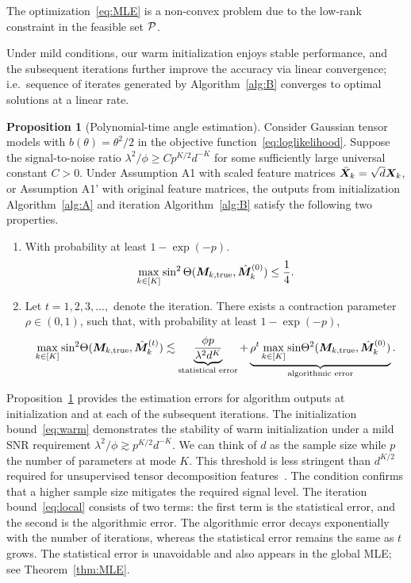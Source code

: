 \documentclass[12pt]{article}
\theoremstyle{definition}
\newtheorem{prop}{Proposition}[section]
\theoremstyle{definition}
\newcommand*{\KeepStyleUnderBrace}[1]{%
  \mathop{%
    \mathchoice
    {\underbrace{\displaystyle#1}}%
    {\underbrace{\textstyle#1}}%
    {\underbrace{\scriptstyle#1}}%
    {\underbrace{\scriptscriptstyle#1}}%
  }\limits
}
\begin{document}
The optimization~\eqref{eq:MLE} is a non-convex problem due to the low-rank constraint in the feasible set $\mathcal{P}$. {  Under mild conditions, our warm initialization enjoys stable performance, and the subsequent iterations further improve the accuracy via linear convergence; i.e.\ sequence of iterates generated by Algorithm~\ref{alg:B} converges to optimal solutions at a linear rate. 

\begin{prop}[Polynomial-time angle estimation]\label{lem:ini} Consider Gaussian tensor models with $b(\theta)=\theta^2/2$ in the objective function~\eqref{eq:loglikelihood}. Suppose the signal-to-noise ratio $\lambda^2/\phi \geq C p^{K/2}d^{-K}$ for some sufficiently large universal constant $C>0$. 
Under Assumption A1 with scaled feature matrices $\bar {\bm X}_k=\sqrt{d}\bm X_k$, or Assumption A1' with original feature matrices, the outputs from initialization Algorithm~\ref{alg:A} and iteration Algorithm~\ref{alg:B} satisfy the following two properties.
\begin{enumerate}[label=(\alph*)]
\item With probability at least $1-\exp(-p)$. 
\begin{equation}\label{eq:warm}
\max_{k\in[K]}\sin^2\Theta(\bm M_{k,\textup{true}},\hat {\bm M}_k^{(0)})\leq {1\over 4}. 
\end{equation}
\item Let $t=1,2,3,\ldots,$ denote the iteration. There exists a contraction parameter $\rho\in(0,1)$, such that, with probability at least $1-\exp(-p)$, 
\begin{equation}\label{eq:local}
\max_{k\in[K]}\textup{sin}^2 \Theta(\trueM, \hat \mM^{(t)}_k) \lesssim \KeepStyleUnderBrace{{\phi p \over \lambda^2 d^K}}_{\text{statistical error}}+\KeepStyleUnderBrace{\rho^{t}\max_{k\in[K]}\textup{sin} \Theta^2(\trueM, \hat \mM_k^{(0)})}_{\text{algorithmic error}}.
\end{equation}
\end{enumerate}
\end{prop}

Proposition~\ref{lem:ini} provides the estimation errors for algorithm outputs at initialization and at each of the subsequent iterations. The initialization bound~\eqref{eq:warm} demonstrates the stability of warm initialization under a mild SNR requirement $\lambda^2/\phi \gtrsim p^{K/2}d^{-K}$. We can think of $d$ as the sample size while $p$ the number of parameters at mode $K$. This threshold is less stringent than $d^{K/2}$ required for unsupervised tensor decomposition features~\citep{han2020optimal,zhang2018tensor}. The condition confirms that a higher sample size mitigates the required signal level. The iteration bound~\eqref{eq:local} consists of two terms: the first term is the statistical error, and the second is the algorithmic error. The algorithmic error decays exponentially with the number of iterations, whereas the statistical error remains the same as $t$ grows. The statistical error is unavoidable and also appears in the global MLE; see Theorem~\ref{thm:MLE}.

}
\end{document}

